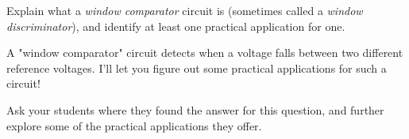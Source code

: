 

Explain what a {\it window comparator} circuit is (sometimes called a {\it window discriminator}), and identify at least one practical application for one.







A "window comparator" circuit detects when a voltage falls between two different reference voltages.  I'll let you figure out some practical applications for such a circuit!







Ask your students where they found the answer for this question, and further explore some of the practical applications they offer.




